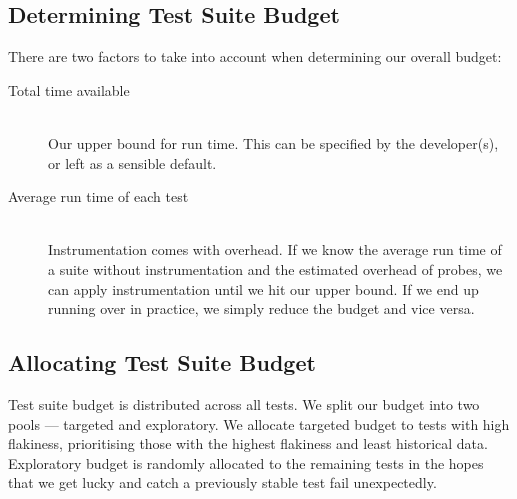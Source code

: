 \subsection{Determining Test Suite Budget}

There are two factors to take into account when determining our overall budget:

\begin{description}
	\item[Total time available] \hfill \\
 		Our upper bound for run time. This can be specified by the developer(s), or left as a sensible default.
	\item[Average run time of each test] \hfill \\
		Instrumentation comes with overhead. If we know the average run time of a suite without instrumentation and the estimated overhead of probes, we can apply instrumentation until we hit our upper bound. If we end up running over in practice, we simply reduce the budget and vice versa.
\end{description}

\subsection{Allocating Test Suite Budget}

Test suite budget is distributed across all tests. We split our budget into two pools --- targeted and exploratory. We allocate targeted budget to tests with high flakiness, prioritising those with the highest flakiness and least historical data. Exploratory budget is randomly allocated to the remaining tests in the hopes that we get lucky and catch a previously stable test fail unexpectedly.



